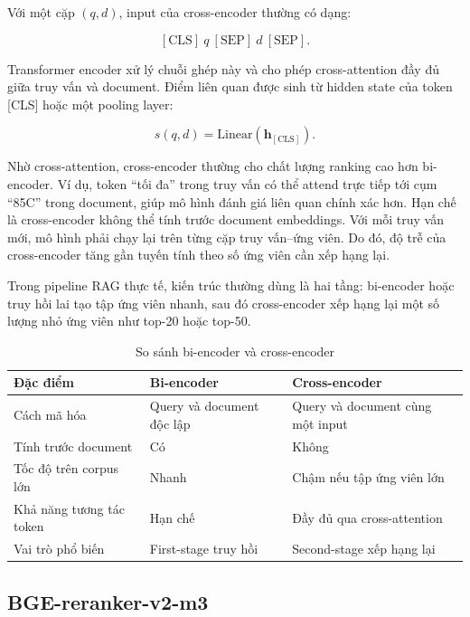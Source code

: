 \documentclass[../DoAn.tex]{subfiles}
\begin{document}
Với một cặp $(q,d)$, input của cross-encoder thường có dạng:

\[
[\mathrm{CLS}]\ q\ [\mathrm{SEP}]\ d\ [\mathrm{SEP}].
\]

Transformer encoder xử lý chuỗi ghép này và cho phép cross-attention đầy đủ giữa truy vấn và document. Điểm liên quan được sinh từ hidden state của token [CLS] hoặc một pooling layer:

\[
s(q,d)
=
\mathrm{Linear}
\left(
\mathbf{h}_{[\mathrm{CLS}]}
\right).
\]

Nhờ cross-attention, cross-encoder thường cho chất lượng ranking cao hơn bi-encoder. Ví dụ, token ``tối đa'' trong truy vấn có thể attend trực tiếp tới cụm ``85\textdegree C'' trong document, giúp mô hình đánh giá liên quan chính xác hơn. Hạn chế là cross-encoder không thể tính trước document embeddings. Với mỗi truy vấn mới, mô hình phải chạy lại trên từng cặp truy vấn--ứng viên. Do đó, độ trễ của cross-encoder tăng gần tuyến tính theo số ứng viên cần xếp hạng lại.

Trong pipeline RAG thực tế, kiến trúc thường dùng là hai tầng: bi-encoder hoặc truy hồi lai tạo tập ứng viên nhanh, sau đó cross-encoder xếp hạng lại một số lượng nhỏ ứng viên như top-20 hoặc top-50.

\begin{table}[H]
\centering
\caption{So sánh bi-encoder và cross-encoder}
\label{tab:biencoder-crossencoder-new}
{\small
\setlength{\tabcolsep}{5pt}
\begin{tabular}{|>{\raggedright\arraybackslash}p{4.0cm}|>{\centering\arraybackslash}p{4.3cm}|>{\centering\arraybackslash}p{4.3cm}|}
\hline
\textbf{Đặc điểm} & \textbf{Bi-encoder} & \textbf{Cross-encoder} \\ \hline
Cách mã hóa & Query và document độc lập & Query và document cùng một input \\ \hline
Tính trước document & Có & Không \\ \hline
Tốc độ trên corpus lớn & Nhanh & Chậm nếu tập ứng viên lớn \\ \hline
Khả năng tương tác token & Hạn chế & Đầy đủ qua cross-attention \\ \hline
Vai trò phổ biến & First-stage truy hồi & Second-stage xếp hạng lại \\ \hline
\end{tabular}
}
\end{table}

\subsection{BGE-reranker-v2-m3}
\label{subsection:2.3.2}
\end{document}
